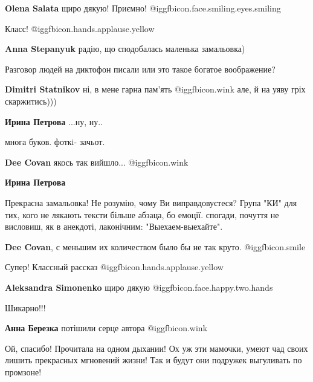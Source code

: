 \begin{itemize}
\textbf{Olena Salata} щиро дякую! Приємно! @igg{fbicon.face.smiling.eyes.smiling} 

Класс!  @igg{fbicon.hands.applause.yellow} 

\begin{itemize} %
\textbf{Anna Stepanyuk} радію, що сподобалась маленька замальовка)
\end{itemize} %


Разговор людей на диктофон писали или это такое богатое воображение?

\begin{itemize} %
\textbf{Dimitri Statnikov} ні, в мене гарна пам'ять  @igg{fbicon.wink}  але, й на уяву гріх скаржитись)))

\textbf{Ирина Петрова} ...ну, ну..
\end{itemize} %

многа буков. фоткi- зачьот.

\begin{itemize} %
\textbf{Dee Covan} якось так вийшло... @igg{fbicon.wink} 

\textbf{Ирина Петрова} 

Прекрасна замальовка! Не розумію, чому Ви виправдовуєтеся? Група "КИ" для тих,
кого не лякають тексти більше абзаца, бо емоції. спогади, почуття не висловиш,
як в анекдоті, лаконічним: "Выехаем-выехайте".

\textbf{Dee Covan}, с меньшим их количеством было бы не так круто. @igg{fbicon.smile} 
\end{itemize} %

Супер! Классный рассказ  @igg{fbicon.hands.applause.yellow} 

\textbf{Aleksandra Simonenko} щиро дякую @igg{fbicon.face.happy.two.hands} 

Шикарно!!!

\textbf{Анна Березка} потішили серце автора @igg{fbicon.wink} 


Ой, спасибо! Прочитала на одном дыхании! Ох уж эти мамочки, умеют чад своих
лишить прекрасных мгновений жизни! Так и будут они подружек выгуливать по
промзоне!


\end{itemize}
